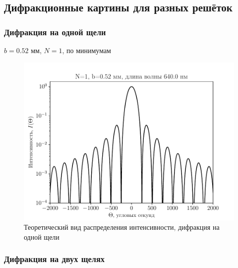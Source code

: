 \subsection{Дифракционные картины для разных решёток}
\subsubsection{Дифракция на одной щели}
\begin{table}[H]
	    \caption{$b=0.52$ мм, $N=1$, по минимумам}
	    \label{tab:chem1}

	\mytable
	
\end{table}
\begin{figure}[H]
	\centering
	\includegraphics[]{plot/N1}
	\caption{Теоретический вид распределения интенсивности, дифракция на одной щели}
	\label{fig:figure1}
\end{figure}
\subsubsection{Дифракция на двух щелях}

